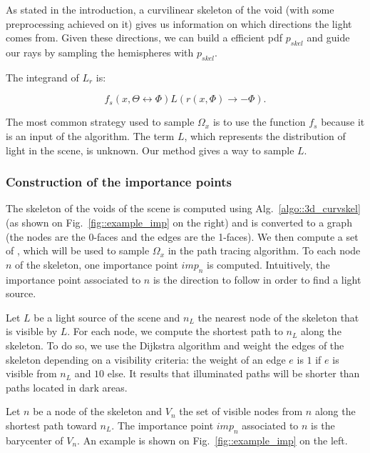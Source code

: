 As stated in the introduction, a curvilinear skeleton of the void (with some preprocessing achieved on it) gives us information on which directions the light comes from. Given these directions, we can build a efficient pdf $p_{skel}$ and guide our rays by sampling the hemispheres with $p_{skel}$.

The integrand of $L_r$ is:

\begin{equation*}
f_s(x, \Theta \leftrightarrow \Phi) L(r(x, \Phi) \rightarrow -\Phi).
\end{equation*}

The most common strategy used to sample $\Omega_x$ is to use the function $f_s$ because it is an input of the algorithm.
The term $L$, which represents the distribution of light in the scene, is unknown. Our method gives a way to sample $L$.


\subsubsection{Construction of the importance points}

The skeleton of the voids of the scene is computed using Alg.~\ref{algo::3d_curvskel} (as shown on Fig.~\ref{fig::example_imp} on the right) and is converted to a graph (the nodes are the 0-faces and the edges are the 1-faces). We then compute a set of , which will be used to sample $\Omega_x$ in the path tracing algorithm. To each node $n$ of the skeleton, one importance point $imp_n$ is computed. Intuitively, the importance point associated to $n$ is the direction to follow in order to find a light source.

Let $L$ be a light source of the scene and $n_L$ the nearest node of the skeleton that is visible by $L$. For each node, we compute the shortest path to $n_L$ along the skeleton. To do so, we use the Dijkstra algorithm and weight the edges of the skeleton depending on a visibility criteria: the weight of an edge $e$ is $1$ if $e$ is visible from $n_L$ and $10$ else. It results that illuminated paths will be shorter than paths located in dark areas.

Let $n$ be a node of the skeleton and $V_n$ the set of visible nodes from $n$ along the shortest path toward $n_L$. The importance point $imp_n$ associated to $n$ is the barycenter of $V_n$. An example is shown on Fig.~\ref{fig::example_imp} on the left.


